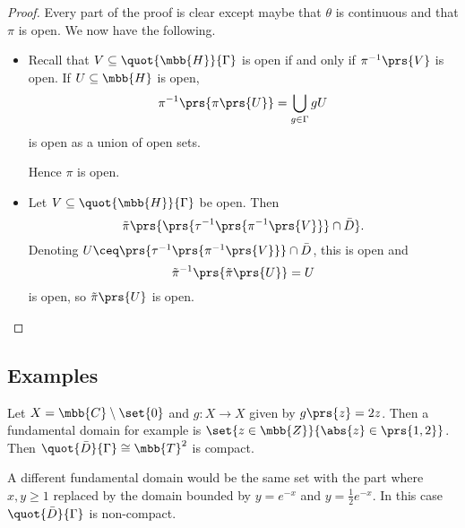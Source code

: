 \documentclass[10pt, twoside]{book}
\begin{document}
\begin{proof}
Every part of the proof is clear except maybe that $\theta$ is continuous and that $\pi$ is open.
We now have the following.
\begin{itemize}
\item Recall that $V \subseteq \quot{\mbb{H}}{\Gamma}$ is open if and only if $\pi^{-1}\prs{V}$ is open. If $U \subseteq \mbb{H}$ is open,
\[\pi^{-1}\prs{\pi\prs{U}} = \bigcup_{g \in \Gamma} gU\]
is open as a union of open sets.

Hence $\pi$ is open.

\item Let $V \subseteq \quot{\mbb{H}}{\Gamma}$ be open. Then
\[\tilde{\pi}\prs{\prs{\tau^{-1}\prs{\pi^{-1}\prs{V}}} \cap \bar{D}} \text{.}\]
Denoting $U \ceq \prs{\tau^{-1}\prs{\pi^{-1}\prs{V}}} \cap \bar{D}$, this is open and
\[\tilde{\pi}^{-1}\prs{\tilde{\pi}\prs{U}} = U\]
is open, so $\tilde{\pi}\prs{U}$ is open.
\end{itemize}
\end{proof}

\subsection{Examples}

\begin{example}
Let $X = \mbb{C} \setminus \set{0}$ and $g \colon X \to X$ given by $g\prs{z} = 2z$. Then a fundamental domain for example is $\set{z \in \mbb{Z}}{\abs{z} \in \prs{1,2}}$. Then $\quot{\bar{D}}{\Gamma} \cong \mbb{T}^2$ is compact.

A different fundamental domain would be the same set with the part where $x,y \geq 1$ replaced by the domain bounded by $y = e^{-x}$ and $y = \frac{1}{2} e^{-x}$. In this case $\quot{\bar{D}}{\Gamma}$ is non-compact.
\end{example}
\end{document}
